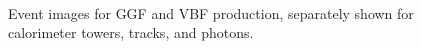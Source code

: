 \documentclass[12pt]{article}
\begin{document}
\begin{figure}[htpb]
{            } \\
            \caption{Event images for GGF and VBF production, separately shown for calorimeter towers, tracks, and photons.}
            \label{fig:GGF_VEF_event_image}
        \end{figure}


\end{document}
